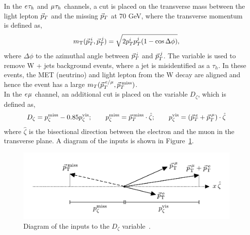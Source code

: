 In the $e_{}\tau_{h}$ and $\mu_{}\tau_{h}$ channels, a cut is placed on the transverse mass between the light lepton $\vec{p}_{T}$ and the missing $\vec{p}_{T}$ at 70 GeV, where the transverse momentum is defined as,
\begin{equation}
m_{\text{T}}(\vec{p}_{T}^{\hspace{2pt}i},\vec{p}_{T}^{\hspace{2pt}j}) = \sqrt{2p_{T}^{i}p_{T}^{j}(1-\cos\Delta\phi)},
\label{eqn:mt}
\end{equation}
where $\Delta\phi$ to the azimuthal angle between $\vec{p}_{T}^{\hspace{2pt}i}$ and $\vec{p}_{T}^{\hspace{2pt}j}$.
The variable is used to remove W + jets background events, where a jet is misidentified as a $\tau_h$.
In these events, the \ac{MET} (neutrino) and light lepton from the W decay are aligned and hence the event has a large $m_{T}(\vec{p}_{T}^{\hspace{2pt}e/\mu},\vec{p}_{T}^{\hspace{2pt}\text{miss}})$. \\

In the $e_{}\mu_{}$ channel, an additional cut is placed on the variable $D_{\zeta}$, which is defined as,
\begin{equation}
D_\zeta = p_\zeta^\text{miss} - 0.85 p_\zeta^\text{vis};\qquad
p_\zeta^\text{miss} = \vec{p}_{T}^{\hspace{2pt}\text{miss}} \cdot \hat{\zeta};\qquad
p_\zeta^\text{vis} = (\vec{p}_{T}^{\hspace{2pt}e} + \vec{p}_{T}^{\hspace{2pt}\mu}) \cdot \hat{\zeta}
\label{eqn:Dzeta_def}
\end{equation}
where $\hat{\zeta}$ is the bisectional direction between the electron and the muon in the transverse plane.
A diagram of the inputs is shown in Figure~\ref{fig:dzeta_diagram}. \\
\begin{figure}[!hbtp]
\centering
    \includegraphics[width=1.0\textwidth]{Figures/dzeta_diagram.pdf}
\caption[Diagram of the inputs to the $D_\zeta$ variable.]{Diagram of the inputs to the $D_\zeta$ variable~\cite{CMS:2022rbd}.}
\label{fig:dzeta_diagram}
\end{figure}

